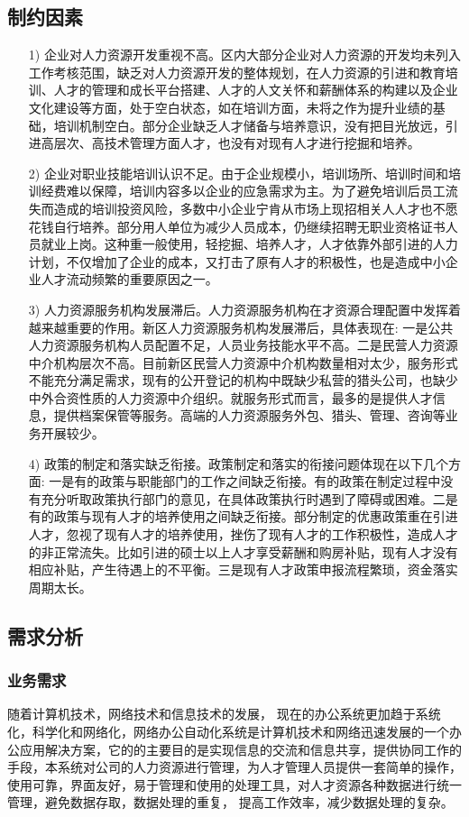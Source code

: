 \documentclass[master]{hduthesis}
\begin{document}
\subsection{制约因素}
\begin{itemize}
	\item[1)]
		企业对人力资源开发重视不高。区内大部分企业对人力资源的开发均未列入工作考核范围，缺乏对人力资源开发的整体规划，在人力资源的引进和教育培训、人才的管理和成长平台搭建、人才的人文关怀和薪酬体系的构建以及企业文化建设等方面，处于空白状态，如在培训方面，未将之作为提升业绩的基础，培训机制空白。部分企业缺乏人才储备与培养意识，没有把目光放远，引进高层次、高技术管理方面人才，也没有对现有人才进行挖掘和培养。
	\item[2)]
		企业对职业技能培训认识不足。由于企业规模小，培训场所、培训时间和培训经费难以保障，培训内容多以企业的应急需求为主。为了避免培训后员工流失而造成的培训投资风险，多数中小企业宁肯从市场上现招相关人人才也不愿花钱自行培养。部分用人单位为减少人员成本，仍继续招聘无职业资格证书人员就业上岗。这种重一般使用，轻挖掘、培养人才，人才依靠外部引进的人力计划，不仅增加了企业的成本，又打击了原有人才的积极性，也是造成中小企业人才流动频繁的重要原因之一。
	\item[3)]
		人力资源服务机构发展滞后。人力资源服务机构在才资源合理配置中发挥着越来越重要的作用。新区人力资源服务机构发展滞后，具体表现在: 一是公共人力资源服务机构人员配置不足，人员业务技能水平不高。二是民营人力资源中介机构层次不高。目前新区民营人力资源中介机构数量相对太少，服务形式不能充分满足需求，现有的公开登记的机构中既缺少私营的猎头公司，也缺少中外合资性质的人力资源中介组织。就服务形式而言，最多的是提供人才信息，提供档案保管等服务。高端的人力资源服务外包、猎头、管理、咨询等业务开展较少。
	\item[4)]
		政策的制定和落实缺乏衔接。政策制定和落实的衔接问题体现在以下几个方面: 一是有的政策与职能部门的工作之间缺乏衔接。有的政策在制定过程中没有充分听取政策执行部门的意见，在具体政策执行时遇到了障碍或困难。二是有的政策与现有人才的培养使用之间缺乏衔接。部分制定的优惠政策重在引进人才，忽视了现有人才的培养使用，挫伤了现有人才的工作积极性，造成人才的非正常流失。比如引进的硕士以上人才享受薪酬和购房补贴，现有人才没有相应补贴，产生待遇上的不平衡。三是现有人才政策申报流程繁琐，资金落实周期太长。
\end{itemize}

\subsection{需求分析}
\subsubsection{业务需求}
随着计算机技术，网络技术和信息技术的发展， 现在的办公系统更加趋于系统化，科学化和网络化，网络办公自动化系统是计算机技术和网络迅速发展的一个办公应用解决方案，它的的主要目的是实现信息的交流和信息共享，提供协同工作的手段，本系统对公司的人力资源进行管理，为人才管理人员提供一套简单的操作，使用可靠，界面友好，易于管理和使用的处理工具，对人才资源各种数据进行统一管理，避免数据存取，数据处理的重复， 提高工作效率，减少数据处理的复杂。
\end{document}
